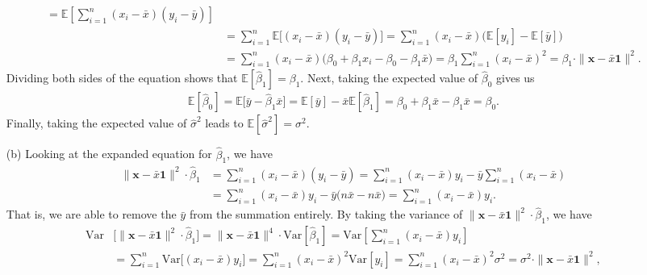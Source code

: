 \documentclass[10pt]{article}
\begin{document}
\begin{itemize}
\begin{align*}
        = \mathbb{E} \left[ \sum_{i=1}^n (x_i - \bar{x})(y_i - \bar{y}) \right] \\ 
        &= \sum_{i=1}^n \mathbb{E} \big[ (x_i - \bar{x})(y_i - \bar{y}) \big] 
        = \sum_{i=1}^n (x_i - \bar{x}) \big( \mathbb{E}[y_i] - \mathbb{E}[\bar{y}] \big) \\
        &= \sum_{i=1}^n (x_i - \bar{x}) \big( \beta_0 + \beta_1 x_i - \beta_0 - \beta_1 \bar{x} \big)
        = \beta_1 \sum_{i=1}^n (x_i - \bar{x})^2 
        = \beta_1 \cdot \|\mathbf{x} - \bar{x}\mathbf{1}\|^2.
    \end{align*}
    Dividing both sides of the equation shows that \(\mathbb{E}[\hat{\beta}_1] = \beta_1\).
    Next, taking the expected value of \(\hat{\beta}_0\) gives us 
    \begin{align*}
        \mathbb{E}[\hat{\beta}_0] = \mathbb{E} \big[ \bar{y} - \hat{\beta}_1 \bar{x} \big] 
        = \mathbb{E}[\bar{y}] - \bar{x}\mathbb{E}[\hat{\beta}_1] 
        = \beta_0 + \beta_1 \bar{x} - \beta_1 \bar{x}
        = \beta_0.
    \end{align*}
    Finally, taking the expected value of \(\hat{\sigma}^2\) leads to \(\mathbb{E}[\hat{\sigma}^2] = \sigma^2\).
    \item[(b)] Looking at the expanded equation for \(\hat{\beta}_1\), we have 
    \begin{align*}
        \|\mathbf{x} - \bar{x}\mathbf{1}\|^2 \cdot \hat{\beta}_1 &= \sum_{i=1}^n (x_i - \bar{x})(y_i - \bar{y})
        = \sum_{i=1}^n (x_i - \bar{x}) y_i - \bar{y} \sum_{i=1}^n (x_i - \bar{x}) \\
        &= \sum_{i=1}^n (x_i - \bar{x}) y_i - \bar{y} \big( n \bar{x} - n \bar x \big)
        = \sum_{i=1}^n (x_i - \bar{x}) y_i.
    \end{align*}
    That is, we are able to remove the \(\bar{y}\) from the summation entirely. By taking the variance of 
    \(\|\mathbf{x} - \bar{x}\mathbf{1}\|^2 \cdot \hat{\beta}_1\), we have 
    \begin{align*}
        \mathrm{Var} &\Big[ \|\mathbf{x} - \bar{x}\mathbf{1}\|^2 \cdot \hat{\beta}_1 \Big]
        = \|\mathbf{x} - \bar{x}\mathbf{1}\|^4 \cdot \mathrm{Var}[\hat{\beta}_1]
        = \mathrm{Var} \left[ \sum_{i=1}^n (x_i - \bar{x}) y_i \right] \\
        &= \sum_{i=1}^n \mathrm{Var}\big[(x_i - \bar{x}) y_i\big]
        = \sum_{i=1}^n (x_i - \bar{x})^2 \mathrm{Var}[y_i]
        = \sum_{i=1}^n (x_i - \bar{x})^2 \sigma^2
        = \sigma^2 \cdot \|\mathbf{x} - \bar{x}\mathbf{1}\|^2,

\end{align*}
\end{itemize}
\end{document}
